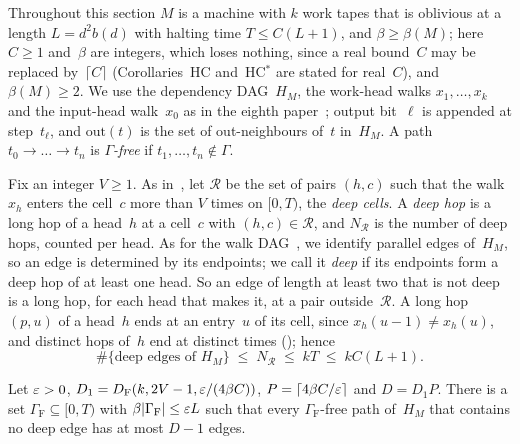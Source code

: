 Throughout this section $M$ is a machine with $k$ work tapes that is oblivious at a length $L=d^2b(d)$ with halting
time $T\le C(L+1)$, and $\beta\ge\beta(M)$; here $C\ge1$ and~$\beta$ are integers, which loses nothing, since a real
bound~$C$ may be replaced by~$\lceil C\rceil$ (Corollaries~HC and~HC$^*$ are stated for real~$C$), and $\beta(M)\ge2$. We use the dependency DAG~$H_M$, the work-head walks $x_1,\dots,x_k$ and the
input-head walk~$x_0$ as in the eighth paper~\cite[Sections~2.2 and~2.4]{BoundedNesting2026}; output bit~$\ell$ is
appended at step~$t_\ell$, and $\mathrm{out}(t)$ is the set of out-neighbours of~$t$ in~$H_M$. A path
$t_0\to\dots\to t_n$ is \emph{$\Gamma$-free} if $t_1,\dots,t_n\notin\Gamma$.

Fix an integer $V\ge1$. As in~\cite[Corollary~3.8]{BoundedNesting2026}, let $\mathcal R$ be the set of pairs $(h,c)$
such that the walk $x_h$ enters the cell~$c$ more than $V$ times on $[0,T)$, the \emph{deep cells}. A \emph{deep hop}
is a long hop of a head~$h$ at a cell~$c$ with $(h,c)\in\mathcal R$, and $N_{\mathcal R}$ is the number of deep hops,
counted per head. As for the walk DAG~\cite[Section~2.3]{BoundedNesting2026}, we identify parallel edges of~$H_M$, so an edge is
determined by its endpoints; we call it
\emph{deep} if its endpoints form a deep hop of at least one head. So an edge of length at least two that is not deep is
a long hop, for each head that makes it, at a pair outside~$\mathcal R$. A long hop $(p,u)$ of a head~$h$ ends at an
entry~$u$ of its cell, since $x_h(u-1)\ne x_h(u)$, and distinct hops of~$h$ end at distinct times
(); hence
\begin{equation}\label{eq:hop-NR}
  \#\{\text{deep edges of }H_M\}\;\le\;N_{\mathcal R}\;\le\;kT\;\le\;kC(L+1).
\end{equation}

\begin{lemma}\label{lem:cold}
Let $\varepsilon>0$, $D_1=D_{\mathrm F}(k,2V-1,\varepsilon/(4\beta C))$, $P=\lceil4\beta C/\varepsilon\rceil$ and $D=D_1P$. There is a set
$\Gamma_{\mathrm F}\subseteq[0,T)$ with $\beta\lvert \Gamma_{\mathrm F} \rvert\le\varepsilon L$ such that every $\Gamma_{\mathrm F}$-free
path of~$H_M$ that contains no deep edge has at most $D-1$ edges.
\end{lemma}

